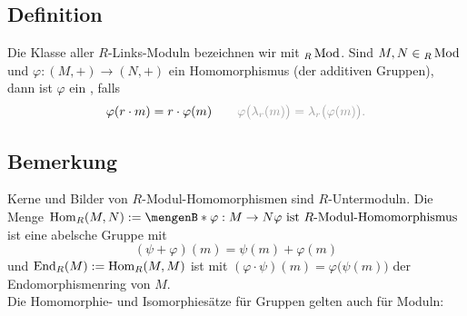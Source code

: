 \subsection[Definition: Klasse der $R$-Moduln, $R$-Modul-Homomorphismen]{Definition} %
\label{sub:27}
Die Klasse aller $R$-Links-Moduln bezeichnen wir mit $_R \operatorname{Mod}$. Sind $M,N \in {_R \operatorname{Mod}}$ und $\varphi : (M,+)\to (N,+)$ ein Homomorphismus (der additiven Gruppen), 
dann ist
$\varphi$ ein , falls
\[
	\varphi(r \cdot m) = r \cdot \varphi(m)\qquad  {\color{light_gray} \varphi \enbrace[\big]{\lambda_r(m)}= \lambda_r \enbrace[\big]{\varphi(m)}  .}
\]

\subsection[Bemerkung zu $\Hom_R(M,N)$]{Bemerkung} %
\label{sub:28}
Kerne und Bilder von $R$-Modul-Homomorphismen sind $R$-Untermoduln. Die Menge $\Hom_R(M,N) := \set[\varphi: M \to N]{\varphi \text{ ist $R$-Modul-Homomorphismus}} $ ist 
eine abelsche Gruppe mit 
\[
	(\psi+ \varphi)(m) = \psi(m)+ \varphi(m)
\]
und $\operatorname{End}_R(M) := \operatorname{Hom}_R(M,M)$ ist mit $(\varphi \cdot \psi)(m) = \varphi\big(\psi(m)\big)$ der Endomorphismenring von $M$.\\
Die Homomorphie- und Isomorphiesätze für Gruppen gelten auch für Moduln:

